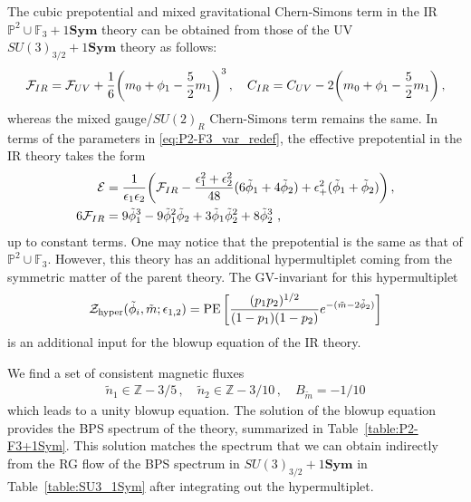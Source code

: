 The cubic prepotential and mixed gravitational Chern-Simons term in the IR $ \mathbb{P}^2 \cup \mathbb{F}_3 + 1\mathbf{Sym} $ theory can be obtained from those of the UV $ SU(3)_{3/2} + 1\mathbf{Sym} $ theory as follows:
\begin{align}
\mathcal{F}_{IR} = \mathcal{F}_{UV} + \frac{1}{6} \qty(m_0 + \phi_1 - \frac{5}{2}m_1)^3 \, , \quad
C_{IR} = C_{UV} - 2\qty(m_0 + \phi_1 - \frac{5}{2}m_1) \, ,
\end{align}
whereas the mixed gauge/$ SU(2)_R $ Chern-Simons term remains the same. In terms of the parameters in \eqref{eq:P2-F3_var_redef}, the effective prepotential in the IR theory takes the form
\begin{align}
\mathcal{E} &= \frac{1}{\epsilon_1 \epsilon_2} \qty(\mathcal{F}_{IR} - \frac{\epsilon_1^2 + \epsilon_2^2}{48} (6 \tilde{\phi}_1 + 4 \tilde{\phi}_2) + \epsilon_+^2 (\tilde{\phi}_1 + \tilde{\phi}_2) ) \, , \nonumber \\
6\mathcal{F}_{IR} &= 9\tilde{\phi}_1^3 - 9\tilde{\phi}_1^2 \tilde{\phi}_2 + 3\tilde{\phi}_1 \tilde{\phi}_2^2 + 8\tilde{\phi}_2^3 \ ,
\end{align}
up to constant terms. One may notice that the prepotential is the same as that of $ \mathbb{P}^2 \cup \mathbb{F}_3 $. However, this theory has an additional hypermultiplet coming from the symmetric matter of the parent theory. The GV-invariant for this hypermultiplet
\begin{align}
\mathcal{Z}_{\mathrm{hyper}}(\tilde{\phi}_i, \tilde{m}; \epsilon_{1,2})
= \operatorname{PE}\qty[ \frac{(p_1 p_2)^{1/2}}{(1-p_1)(1-p_2)} e^{-(\tilde{m} - 2\tilde{\phi}_2)}  ] 
\end{align}
is an additional input for the blowup equation of the IR theory.

We find a set of  consistent magnetic fluxes
\begin{align}
\tilde{n}_1 \in \mathbb{Z} - 3/5 \, , \quad
\tilde{n}_2 \in \mathbb{Z} - 3/10 \, , \quad
B_{\tilde{m}} = -1/10
\end{align}
which leads to a unity blowup equation. The solution of the blowup equation provides the BPS spectrum of the theory, summarized in Table~\ref{table:P2-F3+1Sym}. This solution matches the spectrum that we can obtain indirectly from the RG flow of the BPS spectrum in $ SU(3)_{3/2} + 1\mathbf{Sym} $ in Table~\ref{table:SU3_1Sym} after integrating out the hypermultiplet.


